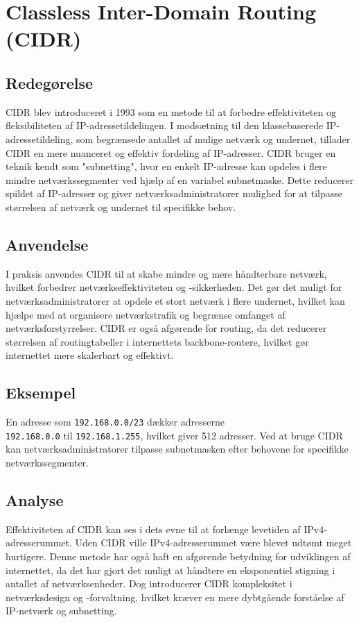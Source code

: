\section{Classless Inter-Domain Routing (CIDR)}

\subsection{Redegørelse}
CIDR blev introduceret i 1993 som en metode til at forbedre effektiviteten og fleksibiliteten af IP-adressetildelingen. I modsætning til den klassebaserede IP-adressetildeling, som begrænsede antallet af mulige netværk og undernet, tillader CIDR en mere nuanceret og effektiv fordeling af IP-adresser. CIDR bruger en teknik kendt som "subnetting", hvor en enkelt IP-adresse kan opdeles i flere mindre netværkssegmenter ved hjælp af en variabel subnetmaske. Dette reducerer spildet af IP-adresser og giver netværksadministratorer mulighed for at tilpasse størrelsen af netværk og undernet til specifikke behov.

\subsection{Anvendelse}
I praksis anvendes CIDR til at skabe mindre og mere håndterbare netværk, hvilket forbedrer netværkseffektiviteten og -sikkerheden. Det gør det muligt for netværksadministratorer at opdele et stort netværk i flere undernet, hvilket kan hjælpe med at organisere netværkstrafik og begrænse omfanget af netværksforstyrrelser. CIDR er også afgørende for routing, da det reducerer størrelsen af routingtabeller i internettets backbone-routere, hvilket gør internettet mere skalerbart og effektivt.

\subsection{Eksempel}
En adresse som \texttt{192.168.0.0/23} dækker adresserne \\\texttt{192.168.0.0} til \texttt{192.168.1.255}, hvilket giver 512 adresser. Ved at bruge CIDR kan netværksadministratorer tilpasse subnetmasken efter behovene for specifikke netværkssegmenter.

\subsection{Analyse}
Effektiviteten af CIDR kan ses i dets evne til at forlænge levetiden af IPv4-adresserummet. Uden CIDR ville IPv4-adresserummet være blevet udtømt meget hurtigere. Denne metode har også haft en afgørende betydning for udviklingen af internettet, da det har gjort det muligt at håndtere en eksponentiel stigning i antallet af netværksenheder. Dog introducerer CIDR kompleksitet i netværksdesign og -forvaltning, hvilket kræver en mere dybtgående forståelse af IP-netværk og subnetting.

